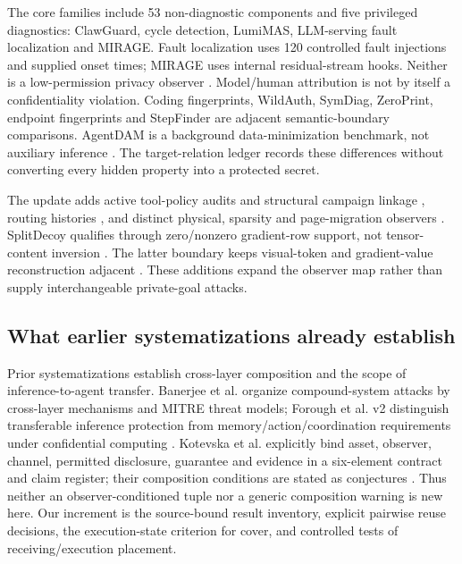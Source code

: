 The \FinalCore{} core families include 53 non-diagnostic components and five privileged diagnostics: ClawGuard, cycle detection, LumiMAS, LLM-serving fault localization and MIRAGE. Fault localization uses 120 controlled fault injections and supplied onset times; MIRAGE uses internal residual-stream hooks. Neither is a low-permission privacy observer \cite{scheinert2026rca,revankar2026mirage}. Model/human attribution is not by itself a confidentiality violation. Coding fingerprints, WildAuth, SymDiag, ZeroPrint, endpoint fingerprints and StepFinder are adjacent semantic-boundary comparisons. AgentDAM is a background data-minimization benchmark, not auxiliary inference \cite{ghaleb2026codingfingerprint,wang2026dialogue,cui2026symdiag,agentdam2025}. The target-relation ledger records these differences without converting every hidden property into a protected secret.

The update adds active tool-policy audits and structural campaign linkage \cite{fayolle2026webagents,wang2026agentprov,wang2026lidar,park2026crosscampaign}, routing histories \cite{chen2026routingmetadata}, and distinct physical, sparsity and page-migration observers \cite{hadad2026shape,alhalawani2026physicaledge,chen2026sparleak,jo2026sparseety,nazaraliyev2026page404}. SplitDecoy qualifies through zero/nonzero gradient-row support, not tensor-content inversion \cite{politis2026splitdecoy}. The latter boundary keeps visual-token and gradient-value reconstruction adjacent \cite{zhou2026visionencoder,politis2026gradients}. These additions expand the observer map rather than supply interchangeable private-goal attacks.

\subsection{What earlier systematizations already establish}
Prior systematizations establish cross-layer composition and the scope of inference-to-agent transfer. Banerjee et al. organize compound-system attacks by cross-layer mechanisms and MITRE threat models; Forough et al. v2 distinguish transferable inference protection from memory/action/coordination requirements under confidential computing \cite{banerjee2024compound,forough2026secrets}. Kotevska et al. explicitly bind asset, observer, channel, permitted disclosure, guarantee and evidence in a six-element contract and claim register; their composition conditions are stated as conjectures \cite[Sections III--IV]{kotevska2026privacyfoundations}. Thus neither an observer-conditioned tuple nor a generic composition warning is new here. Our increment is the source-bound result inventory, explicit pairwise reuse decisions, the execution-state criterion for cover, and controlled tests of receiving/execution placement.


